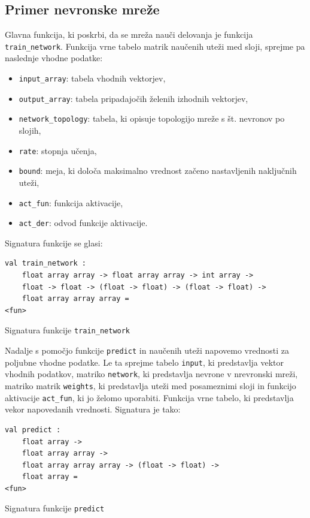 \documentclass[mat1]{fmfdelo}
\begin{document}
\subsection{Primer nevronske mreže}
Glavna funkcija, ki poskrbi, da se mreža nauči delovanja je funkcija  \texttt{train\_network}. Funkcija vrne tabelo matrik naučenih uteži med sloji, sprejme pa naslednje vhodne podatke:
\begin{itemize}
	\item \texttt{input\_array}: tabela vhodnih vektorjev,
	\item \texttt{output\_array}: tabela pripadajočih želenih izhodnih vektorjev,
	\item \texttt{network\_topology}: tabela, ki opisuje topologijo mreže s št. nevronov po slojih,
	\item \texttt{rate}: stopnja učenja,
	\item \texttt{bound}: meja, ki določa maksimalno vrednost začeno nastavljenih naključnih uteži,
	\item \texttt{act\_fun}: funkcija aktivacije,
	\item \texttt{act\_der}: odvod funkcije aktivacije.
\end{itemize}
%
Signatura funkcije se glasi:
%
\begin{listing}[!h]
	\begin{verbatim}
val train_network :
	float array array -> float array array -> int array -> 
	float -> float -> (float -> float) -> (float -> float) -> 
	float array array array =
<fun>
	\end{verbatim} 
	\caption{Signatura funkcije \texttt{train\_network}}
	\label{signatura}
\end{listing}

Nadalje s pomočjo funkcije \texttt{predict} in naučenih uteži napovemo vrednosti za poljubne vhodne podatke. Le ta sprejme tabelo \texttt{input}, ki predstavlja vektor vhodnih podatkov, matriko \texttt{network}, ki predstavlja nevrone v nrevronski mreži, matriko matrik \texttt{weights}, ki predstavlja uteži med posameznimi sloji in funkcijo aktivacije \texttt{act\_fun}, ki jo želomo uporabiti. Funkcija vrne tabelo, ki predstavlja vekor napovedanih vrednosti. Signatura je tako:
%
\begin{listing}[!h]
	\begin{verbatim}
val predict :
	float array ->
	float array array ->
	float array array array -> (float -> float) -> 
	float array = 
<fun>
	\end{verbatim} 
	\caption{Signatura funkcije \texttt{predict}}
	\label{signatura2}
\end{listing}
%
\end{document}

